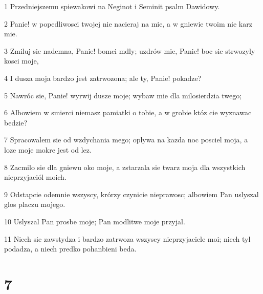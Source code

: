 \par 1 Przedniejszemu spiewakowi na Neginot i Seminit psalm Dawidowy.
\par 2 Panie! w popedliwosci twojej nie nacieraj na mie, a w gniewie twoim nie karz mie.
\par 3 Zmiluj sie nademna, Panie! bomci mdly; uzdrów mie, Panie! boc sie strwozyly kosci moje,
\par 4 I dusza moja bardzo jest zatrwozona; ale ty, Panie! pokadze?
\par 5 Nawróc sie, Panie! wyrwij dusze moje; wybaw mie dla milosierdzia twego;
\par 6 Albowiem w smierci niemasz pamiatki o tobie, a w grobie któz cie wyznawac bedzie?
\par 7 Spracowalem sie od wzdychania mego; oplywa na kazda noc posciel moja, a loze moje mokre jest od lez.
\par 8 Zacmilo sie dla gniewu oko moje, a zstarzala sie twarz moja dla wszystkich nieprzyjaciól moich.
\par 9 Odstapcie odemnie wszyscy, krórzy czynicie nieprawosc; albowiem Pan uslyszal glos placzu mojego.
\par 10 Uslyszal Pan prosbe moje; Pan modlitwe moje przyjal.
\par 11 Niech sie zawstydza i bardzo zatrwoza wszyscy nieprzyjaciele moi; niech tyl podadza, a niech predko pohanbieni beda.

\chapter{7}


